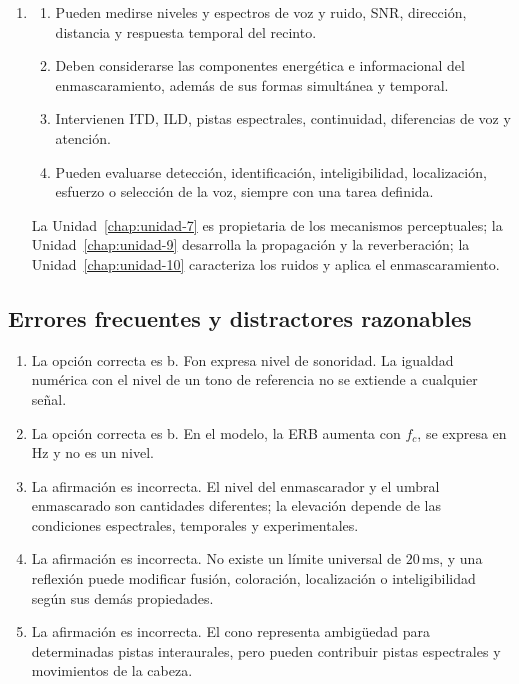 \begin{enumerate}[label=\textbf{P\arabic*.},leftmargin=*]
    \item
    \begin{enumerate}
        \item Pueden medirse niveles y espectros de voz y ruido, SNR,
        dirección, distancia y respuesta temporal del recinto.
        \item Deben considerarse las componentes energética e informacional
        del enmascaramiento, además de sus formas simultánea y temporal.
        \item Intervienen ITD, ILD, pistas espectrales, continuidad,
        diferencias de voz y atención.
        \item Pueden evaluarse detección, identificación, inteligibilidad,
        localización, esfuerzo o selección de la voz, siempre con una tarea
        definida.
    \end{enumerate}
    La Unidad~\ref{chap:unidad-7} es propietaria de los mecanismos
    perceptuales; la Unidad~\ref{chap:unidad-9} desarrolla la propagación y la
    reverberación; la Unidad~\ref{chap:unidad-10} caracteriza los
    ruidos y aplica el enmascaramiento.
\end{enumerate}

\subsection*{Errores frecuentes y distractores razonables}

\begin{enumerate}[label=\textbf{D\arabic*.},leftmargin=*]
    \item La opción correcta es b. Fon expresa nivel de sonoridad. La
    igualdad numérica con el nivel de un tono de referencia no se extiende a
    cualquier señal.

    \item La opción correcta es b. En el modelo, la ERB aumenta con
    \(f_c\), se expresa en \(\text{Hz}\) y no es un nivel.

    \item La afirmación es incorrecta. El nivel del enmascarador y el umbral
    enmascarado son cantidades diferentes; la elevación depende de las
    condiciones espectrales, temporales y experimentales.

    \item La afirmación es incorrecta. No existe un límite universal de
    \(20\,\text{ms}\), y una reflexión puede modificar fusión, coloración,
    localización o inteligibilidad según sus demás propiedades.

    \item La afirmación es incorrecta. El cono representa ambigüedad para
    determinadas pistas interaurales, pero pueden contribuir pistas
    espectrales y movimientos de la cabeza.
\end{enumerate}

